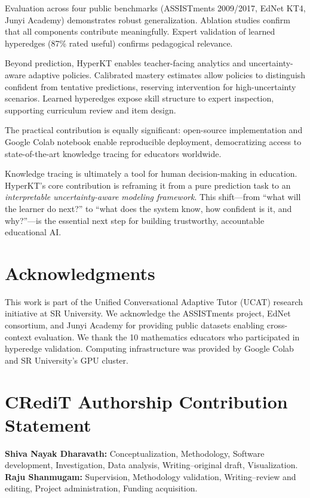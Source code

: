 \documentclass[preprint,12pt]{elsarticle}
\begin{document}
Evaluation across four public benchmarks (ASSISTments 2009/2017, EdNet KT4, Junyi Academy) demonstrates robust generalization. Ablation studies confirm that all components contribute meaningfully. Expert validation of learned hyperedges (87\% rated useful) confirms pedagogical relevance.

Beyond prediction, HyperKT enables teacher-facing analytics and uncertainty-aware adaptive policies. Calibrated mastery estimates allow policies to distinguish confident from tentative predictions, reserving intervention for high-uncertainty scenarios. Learned hyperedges expose skill structure to expert inspection, supporting curriculum review and item design.

The practical contribution is equally significant: open-source implementation and Google Colab notebook enable reproducible deployment, democratizing access to state-of-the-art knowledge tracing for educators worldwide.

Knowledge tracing is ultimately a tool for human decision-making in education. HyperKT's core contribution is reframing it from a pure prediction task to an \textit{interpretable uncertainty-aware modeling framework}. This shift---from ``what will the learner do next?'' to ``what does the system know, how confident is it, and why?''---is the essential next step for building trustworthy, accountable educational AI.

\section*{Acknowledgments}

This work is part of the Unified Conversational Adaptive Tutor (UCAT) research initiative at SR University. We acknowledge the ASSISTments project, EdNet consortium, and Junyi Academy for providing public datasets enabling cross-context evaluation. We thank the 10 mathematics educators who participated in hyperedge validation. Computing infrastructure was provided by Google Colab and SR University's GPU cluster.

\section*{CRediT Authorship Contribution Statement}

\textbf{Shiva Nayak Dharavath:} Conceptualization, Methodology, Software development, Investigation, Data analysis, Writing--original draft, Visualization. \textbf{Raju Shanmugam:} Supervision, Methodology validation, Writing--review and editing, Project administration, Funding acquisition.
\end{document}
